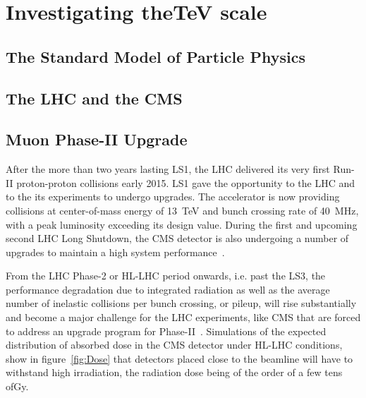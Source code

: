 \graphicspath{{chapt_dutch/}{intro/}{chapt2/}{chapt3/}{chapt4/}{chapt5/}{chapt6/}{chapt7/}{chapt8/}}

\renewcommand\evenpagerightmark{{\scshape\small Chapter 2}}
\renewcommand\oddpageleftmark{{\scshape\small Investigating the\si{TeV} scale}}

\renewcommand{\bibname}{References}

\hyphenation{}

\chapter[Investigating the\si{TeV} scale]%
{Investigating the\si{TeV} scale}
\label{chap:2}

\section{The Standard Model of Particle Physics}
\label{sec:SM}

\section{The \acl{LHC} and the \acl{CMS}}
\label{sec:LHC-CMS}

\section{Muon Phase-II Upgrade}
\label{sec:phase-2}

After the more than two years lasting \acf{LS1}, the \acf{LHC} delivered its very first Run-II proton-proton collisions early 2015. LS1 gave the opportunity to the \acs{LHC} and to the its experiments to undergo upgrades. The accelerator is now providing collisions at center-of-mass energy of \SI{13}{TeV} and bunch crossing rate of \SI{40}{MHz}, with a peak luminosity exceeding its design value. During the first and upcoming second LHC Long Shutdown, the \acf{CMS} detector is also undergoing a number of upgrades to maintain a high system performance~\cite{MUONTDR}.

From the \acs{LHC} Phase-2 or \acf{HL-LHC} period onwards, i.e. past the \acf{LS3}, the performance degradation due to integrated radiation as well as the average number of inelastic collisions per bunch crossing, or pileup, will rise substantially and become a major challenge for the \acs{LHC} experiments, like \acs{CMS} that are forced to address an upgrade program for Phase-II~\cite{PHASEIITP}. Simulations of the expected distribution of absorbed dose in the CMS detector under \acs{HL-LHC} conditions, show in figure~\ref{fig:Dose} that detectors placed close to the beamline will have to withstand high irradiation, the radiation dose being of the order of a few tens of\si{Gy}.

